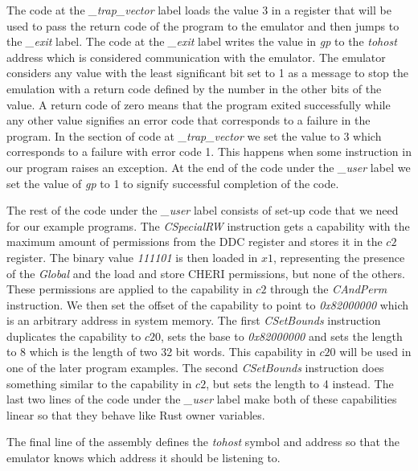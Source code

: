 The code at the \textit{\_trap\_vector} label loads the value 3 in a register that will be used to pass the return code of the program to the emulator and then jumps to the \textit{\_exit} label.
The code at the \textit{\_exit} label writes the value in \textit{gp} to the \textit{tohost} address which is considered communication with the emulator.
The emulator considers any value with the least significant bit set to 1 as a message to stop the emulation with a return code defined by the number in the other bits of the value.
A return code of zero means that the program exited successfully while any other value signifies an error code that corresponds to a failure in the program.
In the section of code at \textit{\_trap\_vector} we set the value to 3 which corresponds to a failure with error code 1.
This happens when some instruction in our program raises an exception.
At the end of the code under the \textit{\_user} label we set the value of \textit{gp} to 1 to signify successful completion of the code.

The rest of the code under the \textit{\_user} label consists of set-up code that we need for our example programs.
The \textit{CSpecialRW} instruction gets a capability with the maximum amount of permissions from the DDC register and stores it in the $c2$ register.
The binary value \textit{111101} is then loaded in $x1$, representing the presence of the \textit{Global} and the load and store CHERI permissions, but none of the others.
These permissions are applied to the capability in $c2$ through the \textit{CAndPerm} instruction.
We then set the offset of the capability to point to \textit{0x82000000} which is an arbitrary address in system memory.
The first \textit{CSetBounds} instruction duplicates the capability to $c20$, sets the base to \textit{0x82000000} and sets the length to 8 which is the length of two 32 bit words.
This capability in $c20$ will be used in one of the later program examples.
The second \textit{CSetBounds} instruction does something similar to the capability in $c2$, but sets the length to 4 instead.
The last two lines of the code under the \textit{\_user} label make both of these capabilities linear so that they behave like Rust owner variables.

The final line of the assembly defines the \textit{tohost} symbol and address so that the emulator knows which address it should be listening to.

